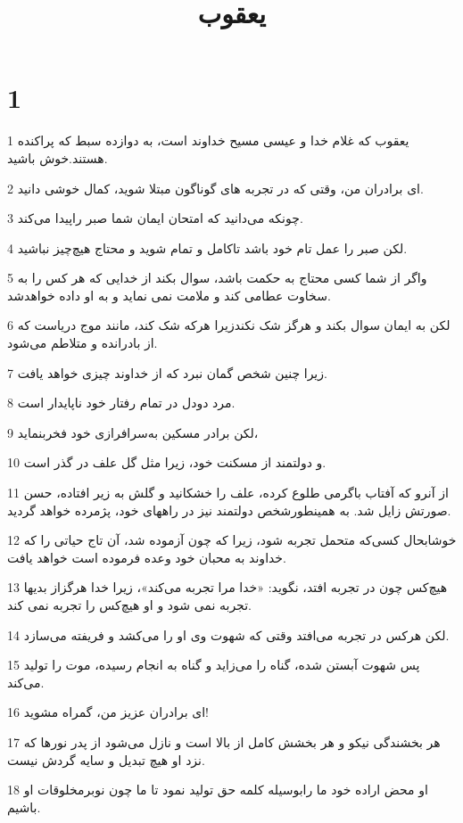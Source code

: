 

\title{يعقوب}


\chapter{1}

\par 1 یعقوب که غلام خدا و عیسی مسیح خداوند است، به دوازده سبط که پراکنده هستند.خوش باشید.
\par 2 ‌ای برادران من، وقتی که در تجربه های گوناگون مبتلا شوید، کمال خوشی دانید.
\par 3 چونکه می‌دانید که امتحان ایمان شما صبر راپیدا می‌کند.
\par 4 لکن صبر را عمل تام خود باشد تاکامل و تمام شوید و محتاج هیچ‌چیز نباشید.
\par 5 واگر از شما کسی محتاج به حکمت باشد، سوال بکند از خدایی که هر کس را به سخاوت عطامی کند و ملامت نمی نماید و به او داده خواهدشد.
\par 6 لکن به ایمان سوال بکند و هرگز شک نکندزیرا هرکه شک کند، مانند موج دریاست که از بادرانده و متلاطم می‌شود.
\par 7 زیرا چنین شخص گمان نبرد که از خداوند چیزی خواهد یافت.
\par 8 مرد دودل در تمام رفتار خود ناپایدار است.
\par 9 لکن برادر مسکین به‌سرافرازی خود فخربنماید،
\par 10 و دولتمند از مسکنت خود، زیرا مثل گل علف در گذر است.
\par 11 از آنرو که آفتاب باگرمی طلوع کرده، علف را خشکانید و گلش به زیر افتاده، حسن صورتش زایل شد. به همینطورشخص دولتمند نیز در راههای خود، پژمرده خواهد گردید.
\par 12 خوشابحال کسی‌که متحمل تجربه شود، زیرا که چون آزموده شد، آن تاج حیاتی را که خداوند به محبان خود وعده فرموده است خواهد یافت.
\par 13 هیچ‌کس چون در تجربه افتد، نگوید: «خدا مرا تجربه می‌کند»، زیرا خدا هرگزاز بدیها تجربه نمی شود و او هیچ‌کس را تجربه نمی کند.
\par 14 لکن هرکس در تجربه می‌افتد وقتی که شهوت وی او را می‌کشد و فریفته می‌سازد.
\par 15 پس شهوت آبستن شده، گناه را می‌زاید و گناه به انجام رسیده، موت را تولید می‌کند.
\par 16 ‌ای برادران عزیز من، گمراه مشوید!
\par 17 هر بخشندگی نیکو و هر بخشش کامل از بالا است و نازل می‌شود از پدر نورها که نزد او هیچ تبدیل و سایه گردش نیست.
\par 18 او محض اراده خود ما رابوسیله کلمه حق تولید نمود تا ما چون نوبرمخلوقات او باشیم.
